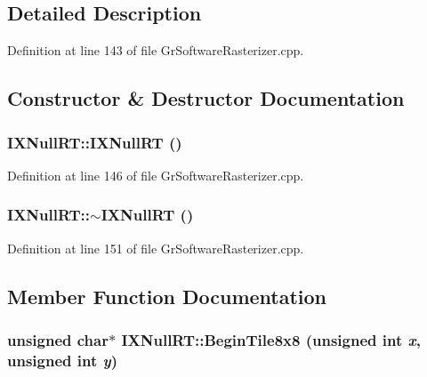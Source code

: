 \subsection{Detailed Description}


Definition at line 143 of file GrSoftwareRasterizer.cpp.

\subsection{Constructor \& Destructor Documentation}
\hypertarget{class_i_x_null_r_t_f81867034269cacdbdde5a579b8393cd}{
\subsubsection[{IXNullRT}]{\setlength{\rightskip}{0pt plus 5cm}IXNullRT::IXNullRT ()}}
\label{class_i_x_null_r_t_f81867034269cacdbdde5a579b8393cd}




Definition at line 146 of file GrSoftwareRasterizer.cpp.\hypertarget{class_i_x_null_r_t_0b59ee7c2ee56faff46d6f391c33e1af}{
\subsubsection[{$\sim$IXNullRT}]{\setlength{\rightskip}{0pt plus 5cm}IXNullRT::$\sim$IXNullRT ()}}
\label{class_i_x_null_r_t_0b59ee7c2ee56faff46d6f391c33e1af}




Definition at line 151 of file GrSoftwareRasterizer.cpp.

\subsection{Member Function Documentation}
\hypertarget{class_i_x_null_r_t_ea6bb9f8e61bf8a53deab237d6c93fd2}{
\subsubsection[{BeginTile8x8}]{\setlength{\rightskip}{0pt plus 5cm}unsigned char$\ast$ IXNullRT::BeginTile8x8 (unsigned int {\em x}, \/  unsigned int {\em y})}}
\label{class_i_x_null_r_t_ea6bb9f8e61bf8a53deab237d6c93fd2}




